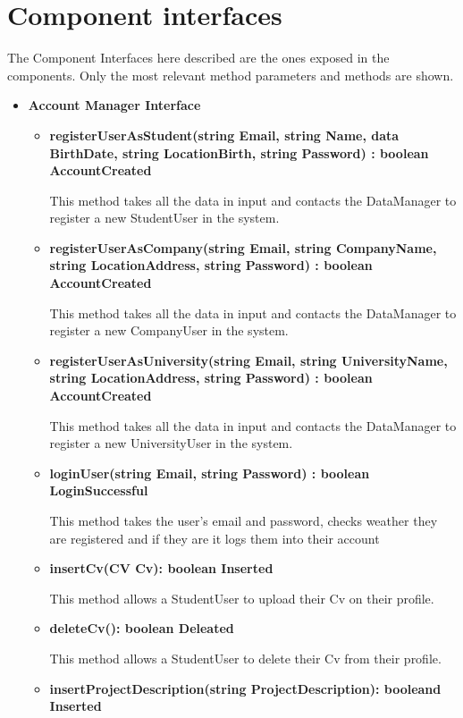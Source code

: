 \section{Component interfaces}
The Component Interfaces here described are the ones exposed in the components. Only the most relevant method parameters and methods
are shown.


\begin{itemize}
\item \textbf{Account Manager Interface}
    \begin{itemize}
    \item \textbf{registerUserAsStudent(string Email, string Name, data BirthDate, string LocationBirth, string Password) : boolean AccountCreated}

    This method takes all the data in input and contacts the DataManager to register a new StudentUser in the system.

    \item \textbf{registerUserAsCompany(string Email, string CompanyName, string LocationAddress, string Password) : boolean AccountCreated}
    
    This method takes all the data in input and contacts the DataManager to register a new CompanyUser in the system.

    \item \textbf{registerUserAsUniversity(string Email, string UniversityName, string LocationAddress, string Password) : boolean AccountCreated}
    
    This method takes all the data in input and contacts the DataManager to register a new UniversityUser in the system.

    \item \textbf{loginUser(string Email, string Password) : boolean LoginSuccessful}
    
    This method takes the user's email and password, checks weather they are registered and if they are it logs them into their account

    \item \textbf{insertCv(CV Cv): boolean Inserted}
    
    This method allows a StudentUser to upload their Cv on their profile. 

    \item \textbf{deleteCv(): boolean Deleated}
    
    This method allows a StudentUser to delete their Cv from their profile.
    
    \item \textbf{insertProjectDescription(string ProjectDescription): booleand Inserted}
    

\end{itemize}
\end{itemize}
